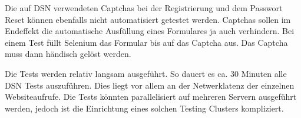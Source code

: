 Die auf DSN verwendeten Captchas bei der Registrierung und dem Passwort Reset können ebenfalls nicht automatisiert getestet werden. Captchas sollen im Endeffekt die automatische Ausfüllung eines Formulares ja auch verhindern. Bei einem Test füllt Selenium das Formular bis auf das Captcha aus. Das Captcha muss dann händisch gelöst werden. \cite{SELENIUMCAPTCHA}

Die Tests werden relativ langsam ausgeführt. So dauert es ca. 30 Minuten alle DSN Tests auszuführen. Dies liegt vor allem an der Netwerklatenz der einzelnen Websiteaufrufe. Die Tests könnten parallelisiert auf mehreren Servern ausgeführt werden, jedoch ist die Einrichtung eines solchen Testing Clusters kompliziert. \cite{SELENIUMGRID}

